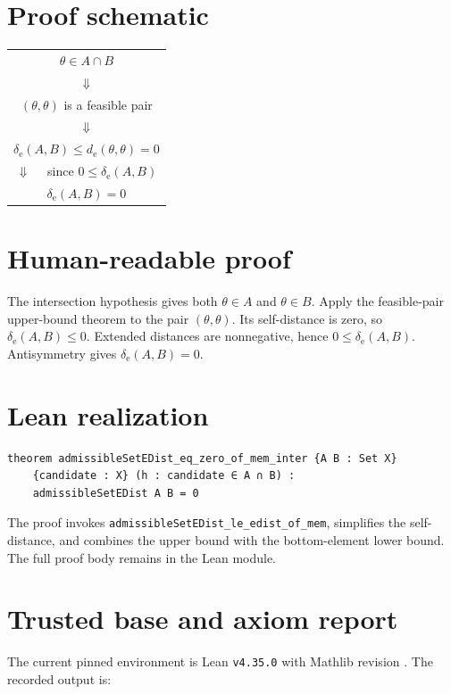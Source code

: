 \documentclass[11pt]{article}
\begin{document}
\section{Proof schematic}

\begin{center}
\begin{tabular}{c}
$\theta\in A\cap B$ \\
$\Downarrow$ \\
$(\theta,\theta)$ is a feasible pair \\
$\Downarrow$ \\
$\delta_{\mathrm e}(A,B)\le d_{\mathrm e}(\theta,\theta)=0$ \\
$\Downarrow\quad$ since $0\le\delta_{\mathrm e}(A,B)$ \\
$\delta_{\mathrm e}(A,B)=0$
\end{tabular}
\end{center}

\section{Human-readable proof}

The intersection hypothesis gives both $\theta\in A$ and $\theta\in B$. Apply the
feasible-pair upper-bound theorem to the pair $(\theta,\theta)$. Its self-distance is
zero, so $\delta_{\mathrm e}(A,B)\le0$. Extended distances are nonnegative, hence
$0\le\delta_{\mathrm e}(A,B)$. Antisymmetry gives
$\delta_{\mathrm e}(A,B)=0$.

\section{Lean realization}

\begin{lstlisting}
theorem admissibleSetEDist_eq_zero_of_mem_inter {A B : Set X}
    {candidate : X} (h : candidate ∈ A ∩ B) :
    admissibleSetEDist A B = 0
\end{lstlisting}

The proof invokes \texttt{admissibleSetEDist\_le\_edist\_of\_mem}, simplifies the
self-distance, and combines the upper bound with the bottom-element lower bound. The
full proof body remains in the Lean module.

\section{Trusted base and axiom report}

The current pinned environment is Lean \texttt{v4.35.0} with Mathlib revision
\texttt{}. The recorded output is:
\end{document}
